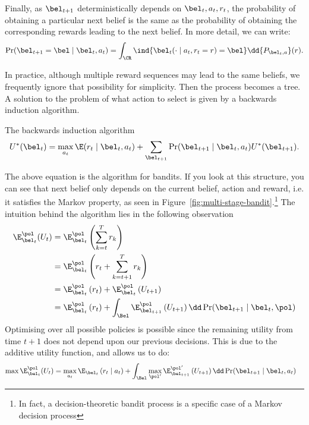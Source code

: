 \begin{definition}
  Finally, as $\bel_{t+1}$ deterministically depends on $\bel_t, a_t, r_t$, the probability of obtaining a particular next belief is the same as the probability of obtaining the corresponding rewards leading to the next belief. In more detail, we can write:
  \begin{equation}
    \label{eq:dt-bandit-belief-probability}
    \Pr(\bel_{t+1} = \bel \mid \bel_t, a_t)
    =
    \int_\CR \ind{\bel_{t}(\cdot \mid a_t, r_t = r) = \bel} \dd{P_{\bel_t, a}}(r). 
  \end{equation}
\end{definition}
In practice, although multiple reward sequences may lead to the same beliefs, we frequently ignore that possibility for simplicity. Then the process becomes a tree. A solution to the problem of what action to select is given by a backwards induction algorithm.
\begin{block}{The backwards induction algorithm}
  \begin{equation}
    U^*(\bel_t) = \max_{a_t} \E(r_t \mid \bel_t, a_t) + \sum_{\bel_{t+1}} \Pr(\bel_{t+1} \mid \bel_t, a_t) U^*(\bel_{t+1}).\label{eq:backwards-induction-bandits}
  \end{equation}
\end{block}
The above equation is the  algorithm for bandits.  If you look at this structure, you can see that  next belief only depends on the current belief, action and reward, i.e. it satisfies the Markov property, as seen in Figure~\ref{fig:multi-stage-bandit}.\footnote{In fact, a decision-theoretic bandit process is a specific case of a Markov decision process}
The intuition behind the algorithm lies in the following observation
\begin{align}
  \E^\pol_{\bel_t}(U_t) 
  &=
    \E^\pol_{\bel_t}\left( 
    \sum_{k=t}^T r_k
    \right)\\
  &=
    \E^\pol_{\bel_t}
    \left( 
    r_t
    +
    \sum_{k=t+1}^T r_k
    \right)\\
  &=
    \E^\pol_{\bel_t}
    \left( 
    r_t
    \right)
    +
    \E^\pol_{\bel_t}
    \left(
    U_{t+1}
    \right)\\
  &=
    \E^\pol_{\bel_t}
    \left( 
    r_t
    \right)
    +
    \int_{\Bel}
    \E^\pol_{\bel_{t+1}}
    \left(
    U_{t+1}
    \right)
    \dd \Pr(\bel_{t+1} \mid \bel_t, \pol)
\end{align}
Optimising over all possible policies is possible since the remaining utility from time $t+1$ does not depend upon our previous decisions. This is due to the additive utility function, and allows us to do:
\begin{align}
  \max \E^\pol_{\bel_t}(U_t) 
  &=
    \max_{a_t}
    \E_{\bel_t}
    \left( 
    r_t
    \mid a_t
    \right)
    +
    \int_{\Bel}
    \max_{\pol'}
    \E^{\pol'}_{\bel_{t+1}}
    \left(
    U_{t+1}
    \right)
    \dd \Pr(\bel_{t+1} \mid \bel_t, a_t)
\end{align}


